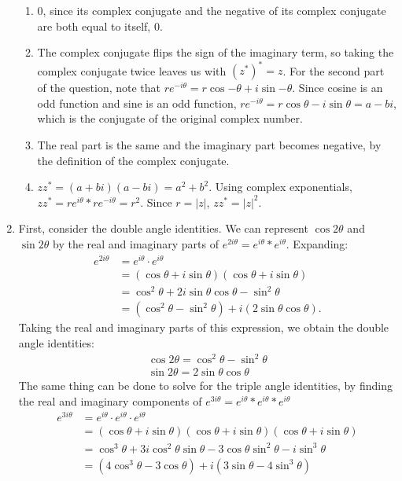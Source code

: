 \begin{sol}
\begin{enumerate}[label=\textbf{(\alph*)}]
\begin{enumerate}[label=\textbf{(\roman*)}]
\item 0, since its complex conjugate and the negative of its complex conjugate are both equal to itself, 0.
    \item The complex conjugate flips the sign of the imaginary term, so taking the complex conjugate twice leaves us with $(z^*)^* = z$. For the second part of the question, note that $re^{-i\theta} = r\cos{-\theta} + i\sin{-\theta}$. Since cosine is an odd function and sine is an odd function, $re^{-i\theta} = r\cos\theta - i\sin\theta = a -bi$, which is the conjugate of the original complex number.
    \item The real part is the same and the imaginary part becomes negative, by the definition of the complex conjugate.
    \item $zz^* = (a + bi)(a - bi) = a^2 + b^2$. Using complex exponentials, $zz^* = re^{i\theta} * re^{-i\theta} = r^2$. Since $r = |z|$, $zz^* = |z|^2$.
\end{enumerate}
\item First, consider the double angle identities. We can represent $\cos{2\theta}$ and $\sin{2\theta}$ by the real and imaginary parts of $e^{2i\theta} = e^{i\theta} * e^{i\theta}$. Expanding:
\begin{align*}
    e^{2i\theta} &= e^{i\theta} \cdot e^{i\theta} \\ &= (\cos\theta + i\sin\theta)(\cos\theta + i\sin\theta) \\ &= \cos^2\theta + 2i\sin\theta\cos\theta - \sin^2\theta \\ &= (\cos^2\theta - \sin^2\theta) + i(2\sin\theta\cos\theta).
\end{align*}
Taking the real and imaginary parts of this expression, we obtain the double angle identities:
\begin{align*}
    \cos{2\theta} = \cos^2\theta - \sin^2\theta \\
    \sin{2\theta} = 2\sin\theta\cos\theta
\end{align*}
The same thing can be done to solve for the triple angle identities, by finding the real and imaginary components of $e^{3i\theta} = e^{i\theta} * e^{i\theta} * e^{i\theta}$
\begin{align*}
    e^{3i\theta} &= e^{i\theta} \cdot e^{i\theta} \cdot e^{i\theta} \\ &= (\cos\theta + i\sin\theta)(\cos\theta + i\sin\theta)(\cos\theta + i\sin\theta) \\ &= \cos^3\theta + 3i\cos^2\theta\sin\theta - 3\cos\theta\sin^2\theta - i\sin^3\theta \\ &= (4\cos^3\theta - 3\cos\theta) + i(3\sin\theta - 4\sin^3\theta)

\end{align*}
\end{enumerate}
\end{sol}
